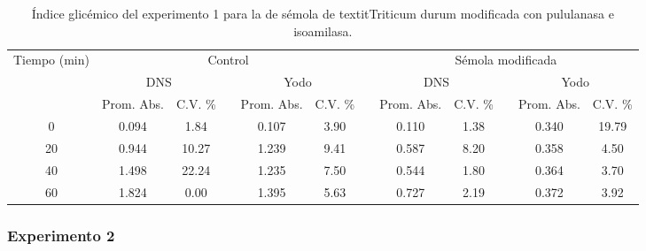 \documentclass{article}
\begin{document}
\begin{table}[htbp]
	\centering
	\caption{Índice glicémico del experimento 1 para la de sémola de textit{Triticum durum} modificada con pululanasa e isoamilasa.}
		\begin{adjustbox}{width=\textwidth}
	\begin{tabular}{cccccccccccc}
		\toprule
		\multicolumn{1}{c}{\multirow{3}[6]{*}{Tiempo (min)}} & \multicolumn{5}{c}{Control}           &       & \multicolumn{5}{c}{Sémola modificada} \\
		\cmidrule{2-6}\cmidrule{8-12}          & \multicolumn{2}{c}{DNS} &       & \multicolumn{2}{c}{Yodo} &       & \multicolumn{2}{c}{DNS} &       & \multicolumn{2}{c}{Yodo} \\
		\cmidrule{2-3}\cmidrule{5-6}\cmidrule{8-9}\cmidrule{11-12}          & Prom. Abs. & C.V. \% &       & Prom. Abs. & C.V. \% &       & Prom. Abs. & C.V. \% &       & Prom. Abs. & C.V. \% \\
		\midrule
		0     & 0.094 & 1.84  &       & 0.107 & 3.90  &       & 0.110 & 1.38  &       & 0.340 & 19.79 \\
		20    & 0.944 & 10.27 &       & 1.239 & 9.41  &       & 0.587 & 8.20  &       & 0.358 & 4.50 \\
		40    & 1.498 & 22.24 &       & 1.235 & 7.50  &       & 0.544 & 1.80  &       & 0.364 & 3.70 \\
		60    & 1.824 & 0.00  &       & 1.395 & 5.63  &       & 0.727 & 2.19  &       & 0.372 & 3.92 \\
		\bottomrule
	\end{tabular}%
	\end{adjustbox}
	\label{tab:e1.3}%
\end{table}%



\subsubsection{Experimento 2}
\end{document}
